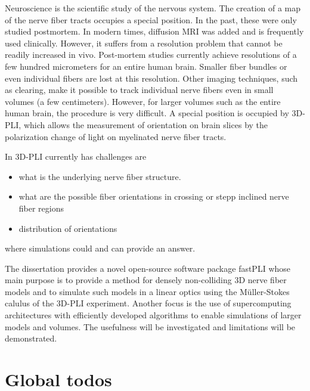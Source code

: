 % 
Neuroscience is the scientific study of the nervous system.
The creation of a map of the nerve fiber tracts occupies a special position.
In the past, these were only studied postmortem. 
In modern times, diffusion MRI was added and is frequently used clinically.
However, it suffers from a resolution problem that cannot be readily increased in vivo.
Post-mortem studies currently achieve resolutions of a few hundred micrometers for an entire human brain.
Smaller fiber bundles or even individual fibers are lost at this resolution.
Other imaging techniques, such as clearing, make it possible to track individual nerve fibers even in small volumes (a few centimeters).
However, for larger volumes such as the entire human brain, the procedure is very difficult.
A special position is occupied by \ac{3D-PLI}, which allows the measurement of orientation on brain slices by the polarization change of light on myelinated nerve fiber tracts.
\par
% 
In \ac{3D-PLI} currently has challenges are
\begin{itemize}
   \item what is the underlying nerve fiber structure.
   \item what are the possible fiber orientations in crossing or stepp inclined nerve fiber regions
   \item distribution of orientations
\end{itemize}
where simulations could and can provide an answer.
\par
% 
The dissertation provides a novel open-source software package \ac{fastPLI} whose main purpose is to provide a method for densely non-colliding 3D nerve fiber models and to simulate such models in a linear optics using the M\"{u}ller-Stokes calulus of the \ac{3D-PLI} experiment.
Another focus is the use of supercomputing architectures with efficiently developed algorithms to enable simulations of larger models and volumes.
The usefulness will be investigated and limitations will be demonstrated.
% 
% 
%
\section{Global todos}
%
\cite{Angles2019}\\
\cite{Callaghan2019}\\
%
